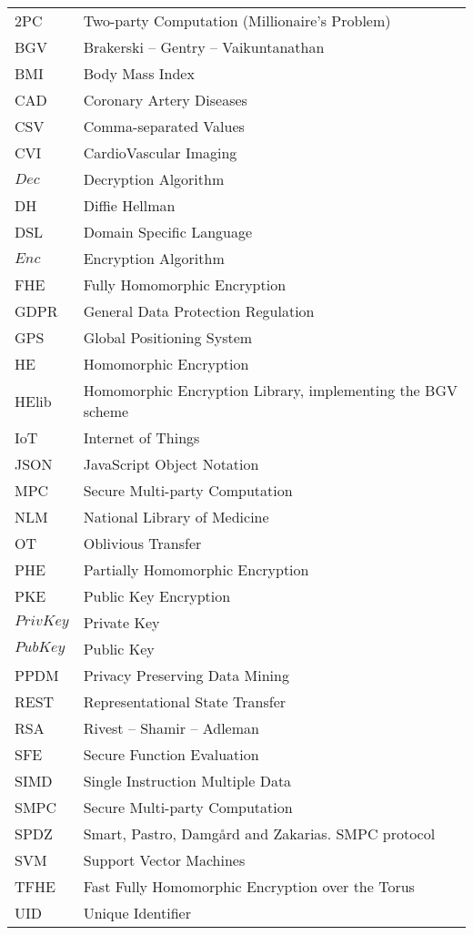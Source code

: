 \abbreviations
\begin{center}
	\renewcommand{\arraystretch}{1.5}
	\begin{longtable}{ l @{\qquad} l }
	\toprule
	2PC       & Two-party Computation (Millionaire's Problem) \\
	BGV       & Brakerski -- Gentry -- Vaikuntanathan \\
	BMI       & Body Mass Index \\
	CAD 			& Coronary Artery Diseases \\
	CSV 			& Comma-separated Values \\
	CVI 			& CardioVascular Imaging \\
	$Dec$     & Decryption Algorithm \\
	DH				& Diffie Hellman \\
	DSL       & Domain Specific Language \\
	$Enc$     & Encryption Algorithm \\
	FHE       & Fully Homomorphic Encryption \\
	GDPR 			& General Data Protection Regulation\\
	GPS 			& Global Positioning System \\
	HE        & Homomorphic Encryption \\
	HElib     & Homomorphic Encryption Library, implementing the BGV scheme \\
	IoT				& Internet of Things \\
	JSON 			& JavaScript Object Notation \\
	MPC 			& Secure Multi-party Computation \\
	NLM 			& National Library of Medicine \\
	OT        & Oblivious Transfer \\
	PHE       & Partially Homomorphic Encryption \\
	PKE 			& Public Key Encryption \\
	$PrivKey$	& Private Key \\
	$PubKey$  & Public Key \\
	PPDM      & Privacy Preserving Data Mining \\
	REST      & Representational State Transfer \\
	RSA				& Rivest -- Shamir -- Adleman \\
	SFE       & Secure Function Evaluation \\
	SIMD      & Single Instruction Multiple Data \\
	SMPC 			& Secure Multi-party Computation \\
	SPDZ      & Smart, Pastro, Damg{\aa}rd and Zakarias. SMPC protocol \\
	SVM 			& Support Vector Machines \\
	TFHE      & Fast Fully Homomorphic Encryption over the Torus \\
	UID 			& Unique Identifier \\

	\bottomrule
	\end{longtable}
\end{center}
